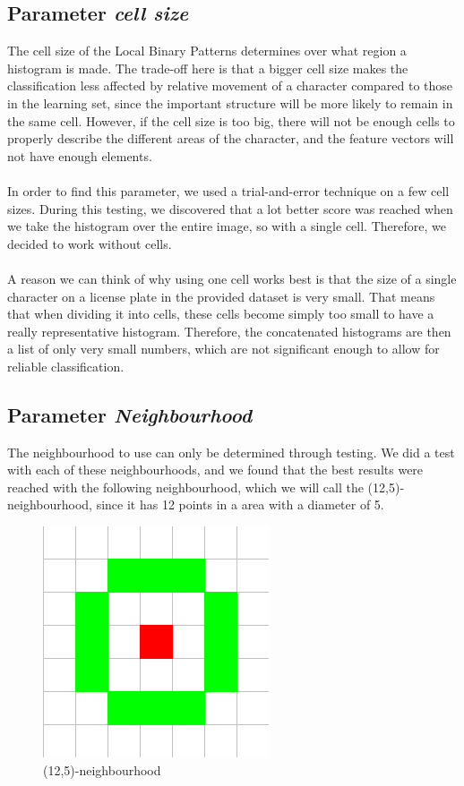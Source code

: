 \documentclass[a4paper]{article}
\begin{document}
\subsection{Parameter \emph{cell size}}

The cell size of the Local Binary Patterns determines over what region a
histogram is made. The trade-off here is that a bigger cell size makes the
classification less affected by relative movement of a character compared to
those in the learning set, since the important structure will be more likely to
remain in the same cell. However, if the cell size is too big, there will not
be enough cells to properly describe the different areas of the character, and
the feature vectors will not have enough elements.\\
\\
In order to find this parameter, we used a trial-and-error technique on a few
cell sizes. During this testing, we discovered that a lot better score was
reached when we take the histogram over the entire image, so with a single
cell. Therefore, we decided to work without cells.\\
\\
A reason we can think of why using one cell works best is that the size of a
single character on a license plate in the provided dataset is very small.
That means that when dividing it into cells, these cells become simply too
small to have a really representative histogram. Therefore, the
concatenated histograms are then a list of only very small numbers, which
are not significant enough to allow for reliable classification.

\subsection{Parameter \emph{Neighbourhood}}

The neighbourhood to use can only be determined through testing. We did a test
with each of these neighbourhoods, and we found that the best results were
reached with the following neighbourhood, which we will call the
(12,5)-neighbourhood, since it has 12 points in a area with a diameter of 5.

\begin{figure}[H]
\center
\includegraphics[scale=0.5]{12-5neighbourhood.png}
\caption{(12,5)-neighbourhood}
\end{figure}
\end{document}
